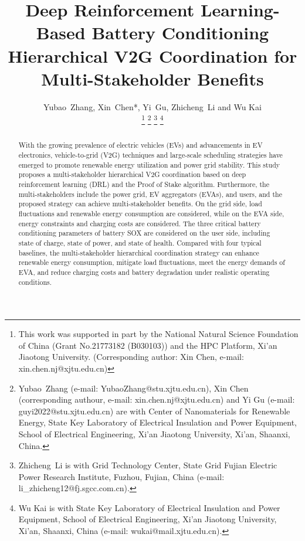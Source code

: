 \documentclass[journal,twoside]{IEEEtran}
\begin{document}
\title{Deep Reinforcement Learning-Based Battery Conditioning Hierarchical V2G Coordination for Multi-Stakeholder Benefits}
\author{Yubao~Zhang, Xin~Chen*, Yi~Gu, Zhicheng~Li and Wu Kai
   
\thanks{This work was supported in part by the National Natural Science Foundation of China (Grant No.21773182 (B030103)) and the HPC Platform, Xi'an Jiaotong University. (Corresponding author: Xin Chen, e-mail: xin.chen.nj@xjtu.edu.cn)}
\thanks{Yubao~Zhang (e-mail: YubaoZhang@stu.xjtu.edu.cn), Xin Chen (corresponding authour, e-mail: xin.chen.nj@xjtu.edu.cn) and Yi Gu (e-mail: guyi2022@stu.xjtu.edu.cn) are with Center of Nanomaterials for Renewable Energy, State Key Laboratory of Electrical Insulation and Power Equipment, School of Electrical Engineering, Xi'an Jiaotong University, Xi'an, Shaanxi, China.}
\thanks{Zhicheng~Li is with Grid Technology Center, State Grid Fujian Electric Power Research Institute, Fuzhou, Fujian, China (e-mail: li\_zhicheng12@fj.sgcc.com.cn).}
\thanks{Wu Kai is with State Key Laboratory of Electrical Insulation and Power Equipment, School of Electrical Engineering, Xi'an Jiaotong University, Xi'an, Shaanxi, China (e-mail: wukai@mail.xjtu.edu.cn).}
}

\maketitle


\begin{abstract}
With the growing prevalence of electric vehicles (EVs) and advancements in EV electronics, vehicle-to-grid (V2G) techniques and large-scale scheduling strategies have emerged to promote renewable energy utilization and power grid stability. This study proposes a multi-stakeholder hierarchical V2G coordination based on deep reinforcement learning (DRL) and the Proof of Stake algorithm. Furthermore, the multi-stakeholders include the power grid, EV aggregators (EVAs), and users, and the proposed strategy can achieve multi-stakeholder benefits. On the grid side, load fluctuations and renewable energy consumption are considered, while on the EVA side, energy constraints and charging costs are considered. The three critical   battery conditioning parameters of battery SOX are considered on the user side, including state of charge, state of power, and state of health. Compared with four typical baselines, the multi-stakeholder hierarchical coordination strategy can enhance renewable energy consumption, mitigate load fluctuations, meet the energy demands of EVA, and reduce charging costs and battery degradation under realistic operating conditions. 


\end{abstract}
\end{document}
